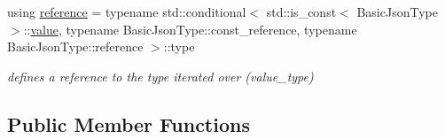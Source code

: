 \begin{DoxyCompactItemize}
using \hyperlink{classnlohmann_1_1detail_1_1iter__impl_a5be8001be099c6b82310f4d387b953ce}{reference} = typename std\+::conditional$<$ std\+::is\+\_\+const$<$ Basic\+Json\+Type $>$\+::\hyperlink{classnlohmann_1_1detail_1_1iter__impl_ab447c50354c6611fa2ae0100ac17845c}{value}, typename Basic\+Json\+Type\+::const\+\_\+reference, typename Basic\+Json\+Type\+::reference $>$\+::type
\begin{DoxyCompactList}\small\item\em defines a reference to the type iterated over (value\+\_\+type) \end{DoxyCompactList}\end{DoxyCompactItemize}
\subsection*{Public Member Functions}
